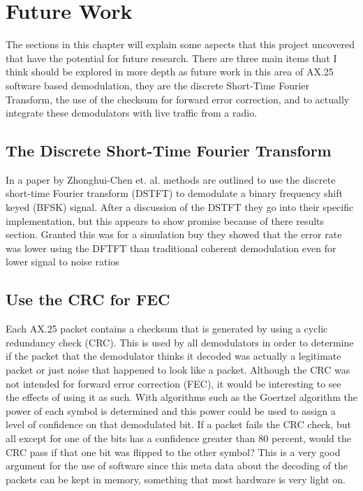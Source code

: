 \chapter{Future Work}
The sections in this chapter will explain some aspects that this project uncovered that have the potential for future research. There are three main items that I think should be explored in more depth as future work in this area of AX.25 software based demodulation, they are the discrete Short-Time Fourier Transform, the use of the checksum for forward error correction, and to actually integrate these demodulators with live traffic from a radio.

\section{The Discrete Short-Time Fourier Transform}
In a paper by Zhonghui-Chen et. al. methods are outlined to use the discrete short-time Fourier transform (DSTFT) to demodulate a binary frequency shift keyed (BFSK) signal. After a discussion of the DSTFT they go into their specific implementation, but this appears to show promise because of there results section. Granted this was for a simulation buy they showed that the error rate was lower using the DFTFT than traditional coherent demodulation even for lower signal to noise ratios \cite{Chen2008}

\section{Use the CRC for FEC}
Each AX.25 packet contains a checksum that is generated by using a cyclic redundancy check (CRC). This is used by all demodulators in order to determine if the packet that the demodulator thinks it decoded was actually a legitimate packet or just noise that happened to look like a packet. Although the CRC was not intended for forward error correction (FEC), it would be interesting to see the effects of using it as such. With algorithms such as the Goertzel algorithm the power of each symbol is determined and this power could be used to assign a level of confidence on that demodulated bit. If a packet fails the CRC check, but all except for one of the bits has a confidence greater than 80 percent, would the CRC pass if that one bit was flipped to the other symbol? This is a very good argument for the use of software since this meta data about the decoding of the packets can be kept in memory, something that most hardware is very light on. 


